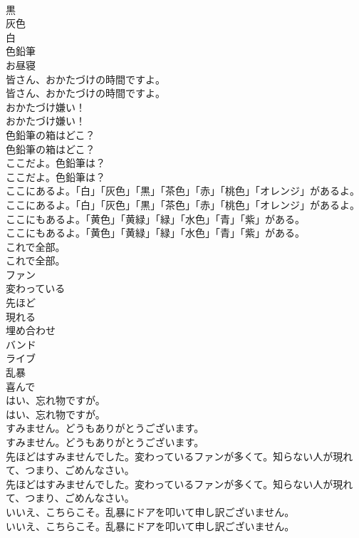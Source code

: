 \documentclass[8pt]{extreport}
\begin{document}
\begin{CJK}{UTF8}{min}
\\	黒
\\	灰色
\\	白
\\	色鉛筆
\\	お昼寝
\\	皆さん、おかたづけの時間ですよ。	
\\	皆さん、おかたづけの時間ですよ。 
\\	おかたづけ嫌い！	
\\	おかたづけ嫌い！ 
\\	色鉛筆の箱はどこ？	
\\	色鉛筆の箱はどこ？ 
\\	ここだよ。色鉛筆は？	
\\	ここだよ。色鉛筆は？ 
\\	ここにあるよ。「白」「灰色」「黒」「茶色」「赤」「桃色」「オレンジ」があるよ。	
\\	ここにあるよ。「白」「灰色」「黒」「茶色」「赤」「桃色」「オレンジ」があるよ。 
\\	ここにもあるよ。「黄色」「黄緑」「緑」「水色」「青」「紫」がある。	
\\	ここにもあるよ。「黄色」「黄緑」「緑」「水色」「青」「紫」がある。 
\\	これで全部。	
\\	これで全部。 
\\	ファン
\\	変わっている
\\	先ほど
\\	現れる
\\	埋め合わせ
\\	バンド
\\	ライブ
\\	乱暴
\\	喜んで
\\	はい、忘れ物ですが。	
\\	はい、忘れ物ですが。 
\\	すみません。どうもありがとうございます。	
\\	すみません。どうもありがとうございます。 
\\	先ほどはすみませんでした。変わっているファンが多くて。知らない人が現れて、つまり、ごめんなさい。	
\\	先ほどはすみませんでした。変わっているファンが多くて。知らない人が現れて、つまり、ごめんなさい。 
\\	いいえ、こちらこそ。乱暴にドアを叩いて申し訳ございません。	
\\	いいえ、こちらこそ。乱暴にドアを叩いて申し訳ございません。 

\end{CJK}
\end{document}
